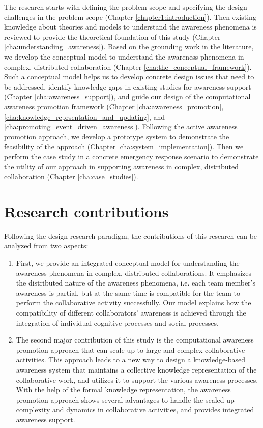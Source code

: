 The research starts with defining the problem scope and specifying the design challenges in the problem scope (Chapter \ref{chapter1:introduction}). Then existing knowledge about theories and models to understand the awareness phenomena is reviewed to provide the theoretical foundation of this study (Chapter \ref{cha:understanding_awareness}). Based on the grounding work in the literature, we develop the conceptual model to understand the awareness phenomena in complex, distributed collaboration (Chapter \ref{cha:the_conceptual_framework}). Such a conceptual model helps us to develop concrete design issues that need to be addressed, identify knowledge gaps in existing studies for awareness support (Chapter \ref{cha:awareness_support}), and guide our design of the computational awareness promotion framework (Chapter \ref{cha:awareness_promotion}, \ref{cha:knowledge_reprsentation_and_updating}, and \ref{cha:promoting_event_driven_awareness}). Following the active awareness promotion approach, we develop a prototype system to demonstrate the feasibility of the approach (Chapter \ref{cha:system_implementation}). Then we perform the case study in a concrete emergency response scenario to demonstrate the utility of our approach in supporting awareness in complex, distributed collaboration (Chapter \ref{cha:case_studies}). 

\section{Research contributions} %
\label{sec:research_contributions}
Following the design-research paradigm, the contributions of this research can be analyzed from two aspects: 

\begin{enumerate}
	\item First, we provide an integrated conceptual model for understanding the awareness phenomena in complex, distributed collaborations. It emphasizes the distributed nature of the awareness phenomena, i.e. each team member's awareness is partial, but at the same time is compatible for the team to perform the collaborative activity successfully. Our model explains how the compatibility of different collaborators' awareness is achieved through the integration of individual cognitive processes and social processes.
	\item The second major contribution of this study is the computational awareness promotion approach that can scale up to large and complex collaborative activities. This approach leads to a new way to design a knowledge-based awareness system that maintains a collective knowledge representation of the collaborative work, and utilizes it to support the various awareness processes. With the help of the formal knowledge representation, the awareness promotion approach shows several advantages to handle the scaled up complexity and dynamics in collaborative activities, and provides integrated awareness support.
\end{enumerate}

